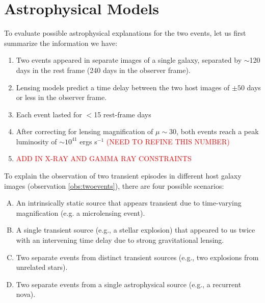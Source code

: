 \section{Astrophysical Models}

To evaluate possible astrophysical explanations for the two \spock
events, let us first summarize the information we have:

\begin{enumerate}
\item{\label{obs:twoevents} Two events appeared in separate images of a single galaxy,
  separated by $\sim$120 days in the rest frame (240 days in the
  observer frame). \label{itm:TwoEvents}}
\item{\label{obs:timedelay} Lensing models predict a time delay between the two host images
  of $\pm50$ days or less in the observer frame.}
\item{\label{obs:timescale} Each event lasted for $<$15 rest-frame days\label{itm:FastLC}}
\item{\label{obs:luminosity} After correcting for lensing magnification of $\mu\sim30$, both
  events reach a peak luminosity of $\sim10^{41}$ ergs s$^{-1}$
  \textcolor{red}{(NEED TO REFINE THIS NUMBER)}}
\item{\label{obs:xray} \textcolor{red}{ADD IN X-RAY AND GAMMA RAY CONSTRAINTS}}
\end{enumerate}


To explain the observation of two transient episodes in different host
galaxy images (observation \ref{obs:twoevents}), there are four possible
scenarios:

\begin{enumerate}[(A)]
\item{\label{case:microlensing} An intrinsically static source that
  appears transient due to time-varying magnification (e.g. a
  microlensing event).}
\item{\label{case:timedelay}A single transient source (e.g., a stellar
  explosion) that appeared to us twice with an intervening time delay
  due to strong gravitational lensing.}
\item{\label{case:twoexplosions} Two separate events from distinct
  transient sources (e.g., two explosions from unrelated stars).}
\item{\label{case:recurrent} Two separate events from a single
  astrophysical source (e.g., a recurrent nova).}
\end{enumerate}



